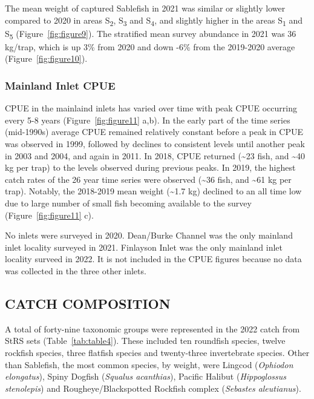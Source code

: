 \documentclass[12pt]{article}\usepackage[]{graphicx}\usepackage[]{color}
\begin{document}
The mean weight of captured Sablefish in 2021 was similar or slightly lower compared to 2020 in areas S\textsubscript{2}, S\textsubscript{3} and S\textsubscript{4}, and slightly higher in the areas S\textsubscript{1} and S\textsubscript{5} (Figure~\ref{fig:figure9}). The stratified mean survey abundance in 2021 was 36 kg/trap, which is up 3\% from 2020 and down -6\% from the 2019-2020 average (Figure~\ref{fig:figure10}).

\hypertarget{mainland-inlet-cpue}{%
\subsubsection{Mainland Inlet CPUE}\label{mainland-inlet-cpue}}

CPUE in the mainlaind inlets has varied over time with peak CPUE occurring every 5-8 years (Figure~\ref{fig:figure11} a,b). In the early part of the time series (mid-1990s) average CPUE remained relatively constant before a peak in CPUE was observed in 1999, followed by declines to consistent levels until another peak in 2003 and 2004, and again in 2011. In 2018, CPUE returned (\textasciitilde23 fish, and \textasciitilde40 kg per trap) to the levels observed during previous peaks. In 2019, the highest catch rates of the 26 year time series were observed (\textasciitilde36 fish, and \textasciitilde61 kg per trap). Notably, the 2018-2019 mean weight (\textasciitilde1.7 kg) declined to an all time low due to large number of small fish becoming available to the survey (Figure~\ref{fig:figure11} c).

No inlets were surveyed in 2020. Dean/Burke Channel was the only mainland inlet locality surveyed in 2021. Finlayson Inlet was the only mainland inlet locality surveed in 2022. It is not included in the CPUE figures because no data was collected in the three other inlets.

\hypertarget{catch-composition}{%
\subsection{CATCH COMPOSITION}\label{catch-composition}}

A total of forty-nine taxonomic groups were represented in the 2022 catch from StRS sets (Table~\ref{tab:table4}). These included ten roundfish species, twelve rockfish species, three flatfish species and twenty-three invertebrate species. Other than Sablefish, the most common species, by weight, were Lingcod (\emph{Ophiodon elongatus}), Spiny Dogfish (\emph{Squalus acanthias}), Pacific Halibut (\emph{Hippoglossus stenolepis}) and Rougheye/Blackspotted Rockfish complex (\emph{Sebastes aleutianus}).
\end{document}
